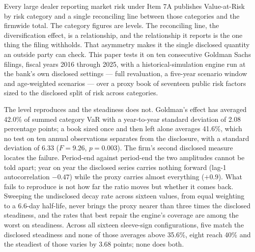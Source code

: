 \noindent
Every large dealer reporting market risk under Item 7A publishes Value-at-Risk
by risk category and a single reconciling line between those categories and the
firmwide total. The category figures are levels. The reconciling line, the diversification
effect, is a relationship, and the relationship it reports is the one thing
the filing withholds. That asymmetry makes it the single disclosed quantity an
outside party can check. This paper tests it on ten consecutive Goldman Sachs filings,
fiscal years 2016 through 2025, with a historical-simulation engine run at the
bank's own disclosed settings --- full revaluation, a five-year scenario window
and age-weighted scenarios --- over a proxy book of seventeen public risk
factors sized to the disclosed split of risk across categories.

The level reproduces and the steadiness does not. Goldman's effect has averaged
42.0\% of summed category VaR with a year-to-year standard deviation of 2.08
percentage points; a book sized once and then left alone averages 41.6\%, which
no test on ten annual observations separates from the disclosure, with a
standard deviation of 6.33 ($F = 9.26$, $p = 0.003$). The firm's second
disclosed measure locates the failure. Period-end against period-end the two
amplitudes cannot be told apart; year on year the disclosed series carries
nothing forward (lag-1 autocorrelation $-0.47$) while the proxy carries almost
everything ($+0.9$). What fails to reproduce is not how far the ratio moves but
whether it comes back. Sweeping the undisclosed decay rate across
sixteen values, from equal weighting to a 6.6-day half-life, never brings the
proxy nearer than three times the disclosed steadiness, and the rates that best
repair the engine's coverage are among the worst on steadiness. Across all
sixteen sleeve-sign configurations, five match the disclosed steadiness and none
of those averages above 35.6\%, eight reach 40\% and the steadiest of those
varies by 3.68 points; none does both.
